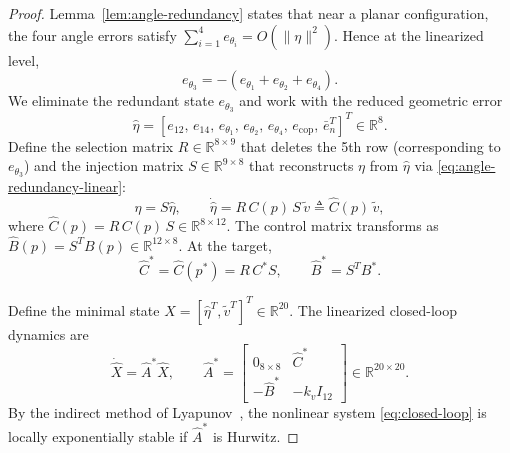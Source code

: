\begin{proof}
Lemma~\ref{lem:angle-redundancy} states that near a planar configuration, the four angle errors satisfy \(\sum_{i=1}^4 e_{\theta_i}=O(\|\eta\|^2)\). Hence at the linearized level,
\begin{equation}
e_{\theta_3}=-(e_{\theta_1}+e_{\theta_2}+e_{\theta_4}).
\label{eq:angle-redundancy-linear}
\end{equation}
We eliminate the redundant state \(e_{\theta_3}\) and work with the reduced geometric error
\begin{equation}
\hat\eta=[e_{12},\,e_{14},\,e_{\theta_1},\,e_{\theta_2},\,e_{\theta_4},\,e_{\mathrm{cop}},\,\bar e_n^{T}]^{T}\in\mathbb R^{8}.
\label{eq:hat-eta}
\end{equation}
Define the selection matrix \(R\in\mathbb R^{8\times 9}\) that deletes the 5th row (corresponding to \(e_{\theta_3}\)) and the injection matrix \(S\in\mathbb R^{9\times 8}\) that reconstructs \(\eta\) from \(\hat\eta\) via \eqref{eq:angle-redundancy-linear}:
\begin{equation}
\eta = S\hat\eta,\qquad
\dot{\hat\eta} = R\,C(p)\,S\,\tilde v \triangleq \hat C(p)\,\tilde v,
\label{eq:reduced-kinematics}
\end{equation}
where \(\hat C(p)=R\,C(p)\,S\in\mathbb R^{8\times 12}\). The control matrix transforms as \(\hat B(p)=S^{T}B(p)\in\mathbb R^{12\times 8}\). At the target,
\begin{equation}
\hat C^*=\hat C(p^*)=R\,C^*S,\qquad
\hat B^*=S^{T}B^*.
\label{eq:hat-CB-star}
\end{equation}

Define the minimal state \(\hat X=[\hat\eta^{T},\tilde v^{T}]^{T}\in\mathbb R^{20}\). The linearized closed-loop dynamics are
\begin{equation}
\boxed{\dot{\hat X} = \hat A^* \hat X},\qquad
\hat A^*=\begin{bmatrix}
0_{8\times 8} & \hat C^*\\[2pt]
-\hat B^* & -k_v I_{12}
\end{bmatrix}\in\mathbb R^{20\times 20}.
\label{eq:Astar}
\end{equation}
By the indirect method of Lyapunov~\cite{khalil2002nonlinear}, the nonlinear system \eqref{eq:closed-loop} is locally exponentially stable if \(\hat A^*\) is Hurwitz.


\end{proof}
